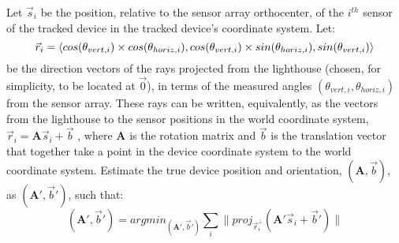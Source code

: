 \documentclass[12pt]{article}
\begin{document}
\DeclarePairedDelimiter{\opair}{\langle}{\rangle}

Let
$\vec{s}_{i}$
be the position, relative to the sensor array orthocenter, of the
$i^{th}$ sensor of the tracked device in the tracked device's coordinate system.
Let:
$$\vec{r}_{i} = \opair{
cos(\theta_{vert,i}) \times cos(\theta_{horiz,i}),
cos(\theta_{vert,i}) \times sin(\theta_{horiz,i}),
sin(\theta_{vert,i})
}$$
be the direction vectors of the rays projected from the lighthouse (chosen, for
simplicity, to be located at $\vec{0}$), in terms of the measured angles
$(\theta_{vert,i},\theta_{horiz,i})$ from the sensor array.
\newline\indent
These rays can be written, equivalently, as the vectors from the lighthouse to
the sensor positions in the world coordinate system,
$\vec{r}_{i} = \mathbf{A} \vec{s}_{i} + \vec{b}$
, where $\mathbf{A}$ is the rotation matrix and $\vec{b}$ is the translation
vector that together take a point in the device coordinate system to the world
coordinate system.
\newline\indent
Estimate the true device position and orientation, $(\mathbf{A},\vec{b})$,
as $(\mathbf{A}',\vec{b}')$, such that:
$$(\mathbf{A}',\vec{b}')=argmin_{(\mathbf{A}',\vec{b}')}\sum_{i} \|proj_{\vec{r}_{i}^{\perp}}(\mathbf{A}' \vec{s}_{i} + \vec{b}')\|$$
\end{document}
